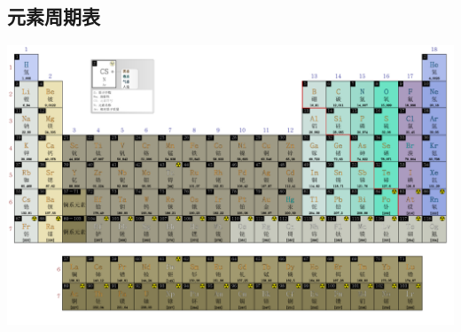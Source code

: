 \begin{landscape}
    \centering
    \chapter{元素周期表}\label{app:3}
    \includegraphics{../pic-pdf/czhx1-periodictable.pdf}
\end{landscape}

